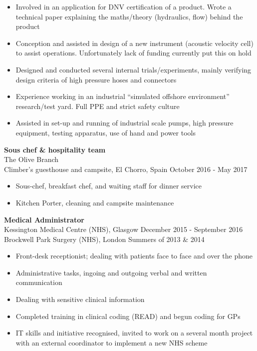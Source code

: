 \documentclass[margin, line, 10pt]{res} %
\begin{document}
\begin{resume}
\begin{itemize}
\item Involved in an application for DNV certification of a product. Wrote a technical paper explaining the maths/theory (hydraulics, flow) behind the product

\item Conception and assisted in design of a new instrument (acoustic velocity cell) to assist operations. Unfortunately lack of funding currently put this on hold

\item Designed and conducted several internal trials/experiments, mainly verifying design criteria of high pressure hoses and connectors 

\item Experience working in an industrial ``simulated offshore environment'' research/test yard. Full PPE and strict safety culture 

\item Assisted in set-up and running of industrial scale pumps, high pressure equipment, testing apparatus, use of hand and power tools

\end{itemize}

\textbf{Sous chef \& hospitality team} \\
The Olive Branch\\
Climber's guesthouse and campsite, El Chorro, Spain \hfill October 2016 - May 2017\\
\begin{itemize} \itemsep -2pt %
\item Sous-chef, breakfast chef, and waiting staff for dinner service 
\item Kitchen Porter, cleaning and campsite maintenance
\end{itemize}

\textbf{Medical Administrator} \\
Kessington Medical Centre (NHS), Glasgow \hfill December 2015 - September 2016\\
Brockwell Park Surgery (NHS), London \hfill Summers of 2013 \& 2014 \\
\begin{itemize} \itemsep -2pt %
\item Front-desk receptionist; dealing with patients face to face and over the phone
\item Administrative tasks, ingoing and outgoing verbal and written communication
\item Dealing with sensitive clinical information
\item Completed training in clinical coding (READ) and begun coding for GPs
\item IT skills and initiative recognised, invited to work on a several month project with an external coordinator to implement a new NHS scheme
\end{itemize}
 

\end{resume}
\end{document}
